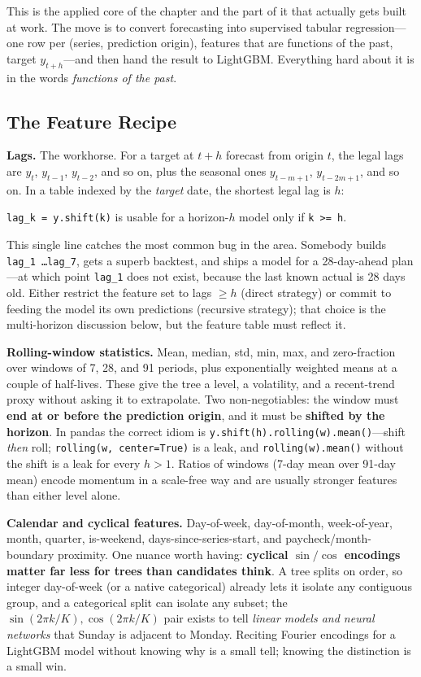 This is the applied core of the chapter and the part of it that actually gets built at work. The move is to convert forecasting into supervised tabular regression---one row per (series, prediction origin), features that are functions of the past, target $y_{t+h}$---and then hand the result to LightGBM. Everything hard about it is in the words \emph{functions of the past}.

\subsection{The Feature Recipe}

\textbf{Lags.} The workhorse. For a target at $t+h$ forecast from origin $t$, the legal lags are $y_t$, $y_{t-1}$, $y_{t-2}$, and so on, plus the seasonal ones $y_{t-m+1}$, $y_{t-2m+1}$, and so on. In a table indexed by the \emph{target} date, the shortest legal lag is $h$:
\begin{center}
\texttt{lag\_k = y.shift(k)} \quad is usable for a horizon-$h$ model only if \texttt{k >= h}.
\end{center}
This single line catches the most common bug in the area. Somebody builds \texttt{lag\_1 \ldots lag\_7}, gets a superb backtest, and ships a model for a 28-day-ahead plan---at which point \texttt{lag\_1} does not exist, because the last known actual is 28 days old. Either restrict the feature set to lags $\ge h$ (direct strategy) or commit to feeding the model its own predictions (recursive strategy); that choice is the multi-horizon discussion below, but the feature table must reflect it.

\textbf{Rolling-window statistics.} Mean, median, std, min, max, and zero-fraction over windows of 7, 28, and 91 periods, plus exponentially weighted means at a couple of half-lives. These give the tree a level, a volatility, and a recent-trend proxy without asking it to extrapolate. Two non-negotiables: the window must \textbf{end at or before the prediction origin}, and it must be \textbf{shifted by the horizon}. In pandas the correct idiom is \texttt{y.shift(h).rolling(w).mean()}---shift \emph{then} roll; \texttt{rolling(w, center=True)} is a leak, and \texttt{rolling(w).mean()} without the shift is a leak for every $h > 1$. Ratios of windows (7-day mean over 91-day mean) encode momentum in a scale-free way and are usually stronger features than either level alone.

\textbf{Calendar and cyclical features.} Day-of-week, day-of-month, week-of-year, month, quarter, is-weekend, days-since-series-start, and paycheck/month-boundary proximity. One nuance worth having: \textbf{cyclical $\sin/\cos$ encodings matter far less for trees than candidates think}. A tree splits on order, so integer day-of-week (or a native categorical) already lets it isolate any contiguous group, and a categorical split can isolate any subset; the $\sin(2\pi k/K), \cos(2\pi k/K)$ pair exists to tell \emph{linear models and neural networks} that Sunday is adjacent to Monday. Reciting Fourier encodings for a LightGBM model without knowing why is a small tell; knowing the distinction is a small win.

